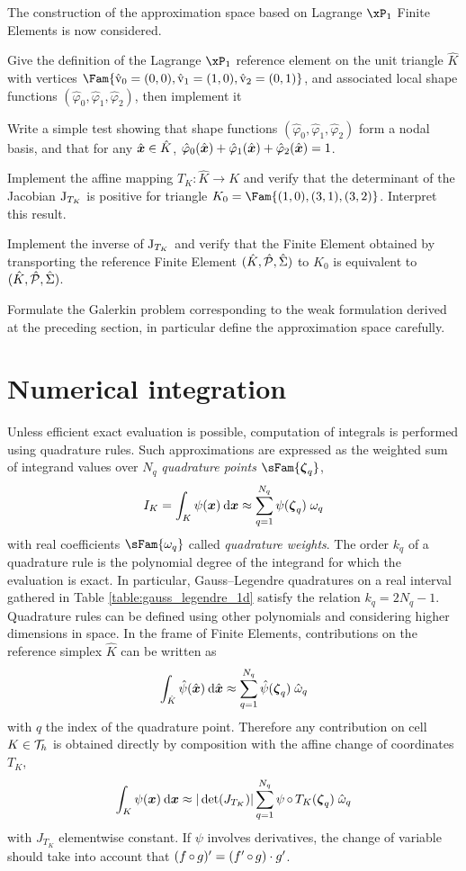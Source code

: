 \documentclass[assignment]{tmanotes}
\begin{document}
The construction of the approximation space based on Lagrange $\xPone$ Finite Elements is now considered.

\medskip
\begin{tmatsks}
\item Give the definition of the Lagrange $\xPone$ reference element on the unit triangle $\hat K$ with vertices $\Fam{ \hat\vertex_0 = (0,0), \hat\vertex_1 = (1,0), \hat\vertex_2 = (0,1)}$, and associated local shape functions $(\hat\varphi_0, \hat\varphi_1, \hat\varphi_2)$, then implement it
\item Write a simple test showing that shape functions $(\hat\varphi_0, \hat\varphi_1, \hat\varphi_2)$ form a nodal basis, and that for any $\hat{{{\boldsymbol x}}}\in\hat K$, $\hat\varphi_0(\hat{{{\boldsymbol x}}}) + \hat\varphi_1(\hat{{{\boldsymbol x}}}) + \hat\varphi_2(\hat{{{\boldsymbol x}}}) = 1$.
\item Implement the affine mapping $T_K: \hat K \rightarrow K$ and verify that the determinant of the Jacobian ${\mathrm J}_{T_K}$ is positive for triangle $K_0 = \Fam{ (1,0), (3,1), (3,2)}$. Interpret this result.
\item Implement the inverse of ${\mathrm J}_{T_K}$ and verify that the Finite Element obtained by transporting the reference Finite Element ${({\hat {{K}}},{\hat {{\mathcal P}}}, {\hat{{\Sigma}}})}$ to $K_0$ is equivalent to ${({\hat {{K}}},{\hat {{\mathcal P}}}, {\hat{{\Sigma}}})}$.
\item Formulate the Galerkin problem corresponding to the weak formulation derived at the preceding section, in particular define the approximation space carefully.
\end{tmatsks}

\section{Numerical integration}

Unless efficient exact evaluation is possible, computation of integrals is performed using quadrature rules.
Such approximations are expressed as the weighted sum of integrand values over $N_{q}$ \textit{quadrature points} $\sFam{\QRn{q}}$,
\[
I_K = \int_K \psi({{\boldsymbol x}}) \hspace{.5ex}{\mathrm d} {{\boldsymbol x}} \approx \sum_{q = 1}^{N_q} \psi(\boldsymbol\zeta_{q})\;\omega_q
\]
with real coefficients $\sFam{\omega_q}$ called \textit{quadrature weights}.
The order $k_q$ of a quadrature rule is the polynomial degree of the integrand for which the evaluation is exact.
In particular, Gauss--Legendre quadratures on a real interval gathered in Table \ref{table:gauss_legendre_1d} satisfy the relation $k_q = 2N_q - 1$.
Quadrature rules can be defined using other polynomials and considering higher dimensions in space.
In the frame of Finite Elements, contributions on the reference simplex $\hat K$ can be written as
\[
\int_{\hat {{K}}} \hat\psi(\hat{{\boldsymbol x}}) \hspace{.5ex}{\mathrm d} \hat{{\boldsymbol x}} \approx \sum_{q = 1}^{N_q} \hat\psi(\boldsymbol\zeta_{q})\;\hat\omega_q
\]
with $q$ the index of the quadrature point.
Therefore any contribution on cell $K \in {\mathcal T}_h$ is obtained directly by composition with the affine change of coordinates $T_K$,
\[
\int_K \psi({{\boldsymbol x}}) \hspace{.5ex}{\mathrm d} {{\boldsymbol x}} \approx |\det(J_{T_K})|\sum_{q = 1}^{N_q} \psi\mathop{\circ}T_K(\boldsymbol\zeta_{q})\;\hat\omega_q
\]
with $J_{T_K}$ elementwise constant.
If $\psi$ involves derivatives, the change of variable should take into account that $(f\mathop{\circ}g)' = (f'\mathop{\circ}g)\cdot g'$.
\end{document}
